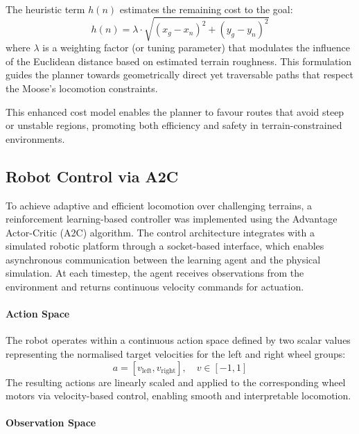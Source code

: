 \documentclass[conference]{IEEEtran}
\begin{document}
The heuristic term \(h(n)\) estimates the remaining cost to the goal:
\[
h(n) = \lambda \cdot \sqrt{(x_g - x_n)^2 + (y_g - y_n)^2}
\]
where \(\lambda\) is a weighting factor (or tuning parameter) that modulates the influence of the Euclidean distance based on estimated terrain roughness. This formulation guides the planner towards geometrically direct yet traversable paths that respect the Moose’s locomotion constraints.

This enhanced cost model enables the planner to favour routes that avoid steep or unstable regions, promoting both efficiency and safety in terrain-constrained environments.

\subsection{Robot Control via A2C}

To achieve adaptive and efficient locomotion over challenging terrains, a reinforcement learning-based controller was implemented using the Advantage Actor-Critic (A2C) algorithm. The control architecture integrates with a simulated robotic platform through a socket-based interface, which enables asynchronous communication between the learning agent and the physical simulation. At each timestep, the agent receives observations from the environment and returns continuous velocity commands for actuation.

\paragraph{Action Space}

The robot operates within a continuous action space defined by two scalar values representing the normalised target velocities for the left and right wheel groups:
\[
a = [v_{\text{left}}, v_{\text{right}}], \quad v \in [-1, 1]
\]
The resulting actions are linearly scaled and applied to the corresponding wheel motors via velocity-based control, enabling smooth and interpretable locomotion.

\paragraph{Observation Space}
\end{document}
